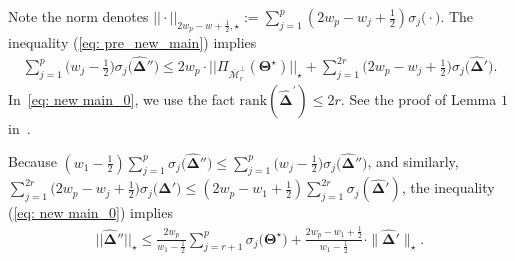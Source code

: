 \documentclass[12pt]{article}
\begin{document}
Note the norm denotes $ ||\cdot||_{2w_{p} - w + \frac{1}{2}, \star} := \sum^{p}_{j = 1} (2w_{p}-w_{j}+\frac{1}{2}) \sigma_{j}\big(\cdot\big)$.
The inequality (\ref{eq: pre_new_main}) implies
\begin{eqnarray} \label{eq: new main_0}
    \sum^{p}_{j = 1}\bigg(w_{j} - \frac{1}{2}\bigg)\sigma_{j}\big(\boldsymbol{\widehat{\Delta}}''\big) \leq  2w_{p} \cdot ||\Pi_{\overline{\mathcal{M}}_{r}^{\perp}}(\boldsymbol{\Theta^{\star}})||_{\star} + \sum^{2r}_{j = 1} \bigg(2w_{p}-w_{j} + \frac{1}{2} \bigg) \sigma_{j}\big(\boldsymbol{\widehat{\Delta}}'\big).
\end{eqnarray}
In~\eqref{eq: new main_0}, we use the fact $\text{rank}(\boldsymbol{\widehat{\Delta}}^{'}) \leq 2r$.
See the proof of Lemma $1$ in~\cite{negahban2011estimation}.

Because  $(w_{1} - \frac{1}{2})\sum^{p}_{j = 1}\sigma_{j}\big(\boldsymbol{\widehat{\Delta}}''\big) \leq \sum^{p}_{j = 1}\big(w_{j} - \frac{1}{2}\big)\sigma_{j}\big(\boldsymbol{\widehat{\Delta}}''\big)$, and similarly, $\sum^{2r}_{j = 1}\big(2w_{p} - w_{j} +  \frac{1}{2}\big)\sigma_{j}\big(\boldsymbol{\widehat{\Delta}}'\big)\leq (2w_{p}-w_{1}+\frac{1}{2})\sum_{j=1}^{2r}\sigma_{j}(\boldsymbol{\widehat{\Delta}}')$,
the inequality (\ref{eq: new main_0}) implies 
\begin{align}
    ||\boldsymbol{\widehat{\Delta}}''||_{\star} \leq \frac{2w_{p}}{w_{1}-\frac{1}{2}} \sum_{j=r+1}^{p}\sigma_{j}\big(\boldsymbol{\Theta^{\star}}\big) 
    + \frac{2w_{p}-w_{1}+\frac{1}{2}}{w_{1}-\frac{1}{2}}\cdot \| \boldsymbol{\widehat{\Delta}}' \|_{\star}.
    \label{eq: new main_1}
\end{align}
\end{document}
